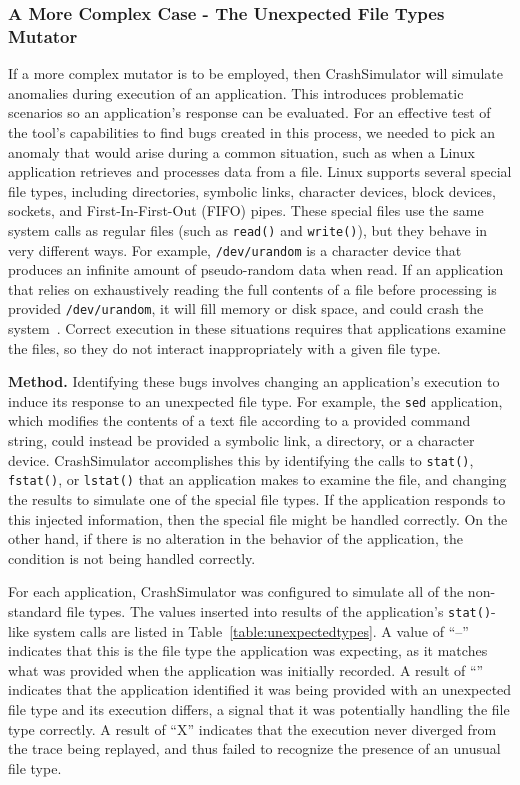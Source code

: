 \subsubsection{A More Complex Case - The Unexpected File Types Mutator}
\label{sec-file-type-bugs}

If a more complex mutator is to be employed, then
CrashSimulator will  simulate anomalies during execution
of an application.
This introduces problematic scenarios
so an application's response
can be evaluated.
For an effective test of the
tool's capabilities to find bugs created in this process,
we needed to pick an anomaly
that would arise during a common situation,
such as when a Linux application retrieves
and processes data from a file.
Linux supports
several special file types,
including
directories,
symbolic links,
character devices,
block devices,
sockets, and
First-In-First-Out (FIFO) pipes.
These special files
use the same system calls
as regular files
(such as {\tt read()} and {\tt write()}),
but they behave in very different ways.
For example,
{\tt /dev/urandom} is a character device
that produces an infinite amount
of pseudo-random data
when read.
If an application
that relies on exhaustively reading the full
contents of a file before processing is provided {\tt /dev/urandom}, it
will fill memory or disk space, and could
crash the system~\cite{YumAptEndless}.
Correct execution in these situations
requires that applications
examine the files, so they do not
interact inappropriately with a given file type.

{\bf Method.}
Identifying these bugs involves changing an application's
execution to induce its response to an unexpected file type. For
example, the {\tt sed} application, which modifies the contents of a text
file according to a provided command string, could instead be provided a symbolic
link, a directory, or a character device.  CrashSimulator
accomplishes this by identifying the calls to {\tt stat()}, {\tt fstat()},
or {\tt lstat()} that an application makes to examine the file, and
changing the results to simulate
one of the special file types.  If the application responds to
this injected information, then the special
file might be handled correctly.  On the other hand, if there is no
alteration in the behavior of the application, the condition is not
being handled correctly.

For each application,
CrashSimulator was configured to simulate all of the non-standard file
types.
The values inserted into results of the application's {\tt stat()}-like
system calls are listed
in Table~\ref{table:unexpectedtypes}.
A value of ``--'' indicates
that this is the file type the application was expecting,
as it matches what was provided when the application was initially recorded.
A result of ``\tickmark'' indicates that the application
identified it was being provided with an unexpected file type and its
execution differs, a signal that it was potentially handling the
file type correctly.
A result of ``X'' indicates
that the execution never diverged from the trace being replayed,
and thus failed to recognize the presence of an unusual file type.

